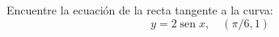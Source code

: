 \setcounter{enumi}{35}
\item Encuentre la ecuación de la recta tangente a la curva:
$$y = 2 \operatorname{sen} x, \quad (\pi/6, 1)$$
